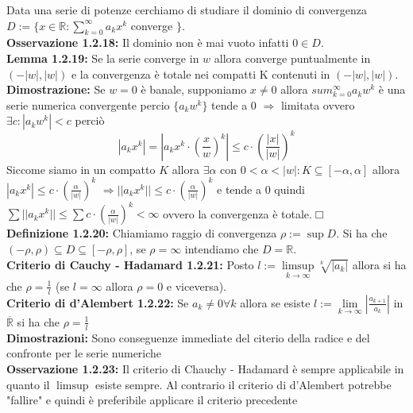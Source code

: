 \documentclass[a4paper,11pt,titlepage]{book}
\begin{document}
Data una serie di potenze cerchiamo di studiare il dominio di convergenza $D:=\{x\in\mathbb{R}:\sum_{k=0}^{\infty}a_k x^k$ converge $\}$. \\

\textbf{Osservazione 1.2.18:} Il dominio non è mai vuoto infatti $0\in D$.\\

\textbf{Lemma 1.2.19:} Se la serie converge in $w$ allora converge puntualmente in $(-|w|,|w|)$ e la convergenza è totale nei compatti K contenuti in $(-|w|,|w|)$.\\

\textbf{Dimostrazione:} Se $w=0$ è banale, supponiamo $x\ne 0$ allora $sum_{k=0}^{\infty}a_k w^k$ è una serie numerica convergente percio $\{a_k w^k\}$ tende a 0 $\Rightarrow$ limitata ovvero $\exists c:|a_k w^k|<c$ perciò $$|a_k x^k|=|a_k x^k\cdot\left (\frac{x}{w} \right )^k|\leq c \cdot \left(\frac{|x|}{|w|} \right)^k$$ Siccome siamo in un compatto $K$ allora $\exists\alpha$ con $0<\alpha <|w|:K\subseteq[-\alpha , \alpha]$ allora $|a_k x^k|\leq c \cdot \left(\frac{\alpha}{|w|} \right)^k$ $\Rightarrow ||a_k x^k||\leq c \cdot \left(\frac{\alpha}{|w|} \right)^k$ e tende a 0 quindi $\sum ||a_k x^k|| \leq \sum c \cdot \left(\frac{\alpha}{|w|} \right)^k<\infty$ ovvero la convergenza è totale.$\Box$ \\

\textbf{Definizione 1.2.20:} Chiamiamo raggio di convergenza $\rho := \sup D$. Si ha che $(-\rho,\rho)\subseteq D \subseteq [-\rho,\rho]$, se $\rho=\infty$ intendiamo che $D=\mathbb{R}$.\\

\textbf{Criterio di Cauchy - Hadamard 1.2.21:} Posto $l:=\limsup\limits_{k\to\infty}\sqrt[k]{|a_k|}$ allora si ha che $\rho=\frac{1}{l}$ (se $l=\infty$ allora $\rho=0$ e viceversa).\\

\textbf{Criterio di d'Alembert 1.2.22:} Se $a_k \ne 0 \forall k$ allora se esiste $l:=\lim\limits_{k\to\infty} \left|\frac{a_{k+1}}{a_k}\right|$ in $\overline{\mathbb{R}}$ si ha che $\rho=\frac{1}{l}$\\

\textbf{Dimostrazioni:} Sono conseguenze immediate del citerio della radice e del confronte per le serie numeriche\\

\textbf{Osservazione 1.2.23:} Il criterio di Chauchy - Hadamard è sempre applicabile in quanto il $\limsup$ esiste sempre. Al contrario il criterio di d'Alembert potrebbe "fallire" e quindi è preferibile applicare il criterio precedente\\
\end{document}
